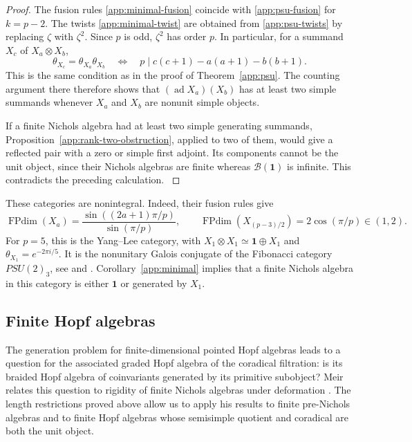 \documentclass[11pt, a4paper]{article}
\numberwithin{equation}{section}
\newcommand{\B}{\mathcal B}
\newcommand{\one}{\mathbf 1}
\DeclareMathOperator{\ad}{ad}
\begin{document}
\begin{proof}
The fusion rules \eqref{app:minimal-fusion} coincide with
\eqref{app:psu-fusion} for $k=p-2$.
The twists \eqref{app:minimal-twist} are obtained from
\eqref{app:psu-twists} by replacing $\zeta$ with $\zeta^2$.
Since $p$ is odd, $\zeta^2$ has order $p$.
In particular, for a summand $X_c$ of $X_a\otimes X_b$,
\[
 \theta_{X_c}=\theta_{X_a}\theta_{X_b}
 \quad\Longleftrightarrow\quad
 p\mid c(c+1)-a(a+1)-b(b+1).
\]
This is the same condition as in the proof of
Theorem~\ref{app:psu}.
The counting argument there therefore shows that
$(\ad X_a)(X_b)$ has at least two simple summands
whenever $X_a$ and $X_b$ are nonunit simple objects.


{
If a finite Nichols algebra had at least two simple generating
summands, Proposition~\ref{app:rank-two-obstruction}, applied
to two of them, would give a reflected pair with a zero or
simple first adjoint.
Its components cannot be the unit object, since their Nichols
algebras are finite whereas $\B(\one)$ is infinite.
This contradicts the preceding calculation.
}
\end{proof}

These categories are nonintegral. Indeed, their fusion rules give
\[
 \operatorname{FPdim}(X_a)
 =\frac{\sin((2a+1)\pi/p)}{\sin(\pi/p)},
 \qquad
 \operatorname{FPdim}(X_{(p-3)/2})=2\cos(\pi/p)\in(1,2).
\]
For $p=5$, this is the Yang--Lee category, with
$X_1\otimes X_1\simeq\one\oplus X_1$ and
$\theta_{X_1}=e^{-2\pi i/5}$.
It is the nonunitary Galois conjugate of the Fibonacci category
$PSU(2)_3$, see \cite[Section~1]{RSW09} and
\cite[Section~5.2]{BD12}.
Corollary~\ref{app:minimal} implies that a finite Nichols algebra
in this category is either $\one$ or generated by $X_1$.

\endgroup

\subsection{Finite Hopf algebras}
The generation problem for finite-dimensional pointed Hopf
 {algebras leads to a  question for the associated
graded Hopf algebra of the coradical filtration: is its braided
Hopf algebra of coinvariants generated by its primitive subobject?}
Meir relates this question to rigidity of finite Nichols
algebras under deformation
\cite[Section~1 and Theorems~1.6--1.7]{defofnichols}.
The length restrictions proved above allow us to apply his
results to finite pre-Nichols algebras and to finite Hopf
algebras whose semisimple quotient and coradical are both
the unit object.
\end{document}
